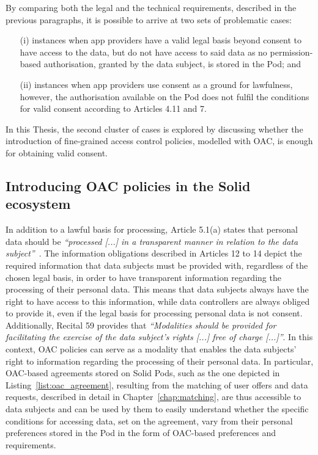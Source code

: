 By comparing both the legal and the technical requirements, described in the previous paragraphs, it is possible to arrive at two sets of problematic cases:
\begin{itemize}
    \item[(i)] instances when app providers have a valid legal basis beyond consent to have access to the data, but do not have access to said data as no permission-based authorisation, granted by the data subject, is stored in the Pod; and
    \item[(ii)] instances when app providers use consent as a ground for lawfulness, however, the authorisation available on the Pod does not fulfil the conditions for valid consent according to Articles 4.11 and 7.
\end{itemize}

In this Thesis, the second cluster of cases is explored by discussing whether the introduction of fine-grained access control policies, modelled with OAC, is enough for obtaining valid consent.

\subsection{Introducing OAC policies in the Solid ecosystem} %
\label{sec:oac_notice_automation}

In addition to a lawful basis for processing, Article 5.1(a) states that personal data should be \textit{``processed [...] in a transparent manner in relation to the data subject''}~\citeyearpar{noauthor_regulation_2016}.
The information obligations described in Articles 12 to 14 depict the required information that data subjects must be provided with, regardless of the chosen legal basis, in order to have transparent information regarding the processing of their personal data.
This means that data subjects always have the right to have access to this information, while data controllers are always obliged to provide it, even if the legal basis for processing personal data is not consent.
Additionally, Recital 59 provides that \textit{``Modalities should be provided for facilitating the exercise of the data subject’s rights [...] free of charge [...]''}.
In this context, OAC policies can serve as a modality that enables the data subjects' right to information regarding the processing of their personal data.
In particular, OAC-based agreements stored on Solid Pods, such as the one depicted in Listing~\ref{list:oac_agreement}, resulting from the matching of user offers and data requests, described in detail in Chapter~\ref{chap:matching}, are thus accessible to data subjects and can be used by them to easily understand whether the specific conditions for accessing data, set on the agreement, vary from their personal preferences stored in the Pod in the form of OAC-based preferences and requirements.

